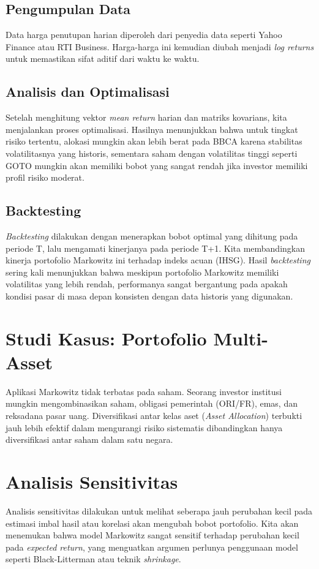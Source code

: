 \documentclass[12pt,a4paper]{book}
\begin{document}
\subsection{Pengumpulan Data}
Data harga penutupan harian diperoleh dari penyedia data seperti Yahoo Finance atau RTI Business. Harga-harga ini kemudian diubah menjadi \textit{log returns} untuk memastikan sifat aditif dari waktu ke waktu.

\subsection{Analisis dan Optimalisasi}
Setelah menghitung vektor \textit{mean return} harian dan matriks kovarians, kita menjalankan proses optimalisasi. Hasilnya menunjukkan bahwa untuk tingkat risiko tertentu, alokasi mungkin akan lebih berat pada BBCA karena stabilitas volatilitasnya yang historis, sementara saham dengan volatilitas tinggi seperti GOTO mungkin akan memiliki bobot yang sangat rendah jika investor memiliki profil risiko moderat.

\subsection{Backtesting}
\textit{Backtesting} dilakukan dengan menerapkan bobot optimal yang dihitung pada periode T, lalu mengamati kinerjanya pada periode T+1. Kita membandingkan kinerja portofolio Markowitz ini terhadap indeks acuan (IHSG). Hasil \textit{backtesting} sering kali menunjukkan bahwa meskipun portofolio Markowitz memiliki volatilitas yang lebih rendah, performanya sangat bergantung pada apakah kondisi pasar di masa depan konsisten dengan data historis yang digunakan.

\section{Studi Kasus: Portofolio Multi-Asset}
Aplikasi Markowitz tidak terbatas pada saham. Seorang investor institusi mungkin mengombinasikan saham, obligasi pemerintah (ORI/FR), emas, dan reksadana pasar uang. Diversifikasi antar kelas aset (\textit{Asset Allocation}) terbukti jauh lebih efektif dalam mengurangi risiko sistematis dibandingkan hanya diversifikasi antar saham dalam satu negara.

\section{Analisis Sensitivitas}
Analisis sensitivitas dilakukan untuk melihat seberapa jauh perubahan kecil pada estimasi imbal hasil atau korelasi akan mengubah bobot portofolio. Kita akan menemukan bahwa model Markowitz sangat sensitif terhadap perubahan kecil pada \textit{expected return}, yang menguatkan argumen perlunya penggunaan model seperti Black-Litterman atau teknik \textit{shrinkage}.
\end{document}

